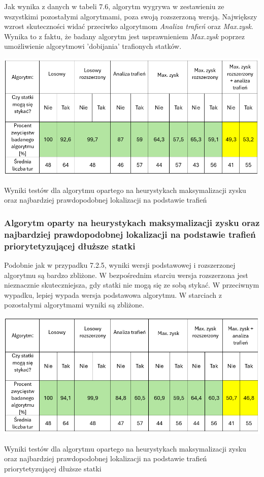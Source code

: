 Jak wynika z danych w tabeli 7.6, algorytm wygrywa w zestawieniu ze wszystkimi pozostałymi algorytmami, poza swoją rozszerzoną wersją. Największy wzrost skuteczności widać przeciwko algorytmom \emph{Analiza trafień} oraz \emph{Max.zysk}. Wynika to z faktu, że badany algorytm jest usprawnieniem \emph{Max.zysk} poprzez umożliwienie algorytmowi 'dobijania' trafionych statków.

\begin{table}[!h]
    \centering
    \includegraphics[width=1\linewidth]{img/table-location-hit-heuristic.png}
    \caption{Wyniki testów dla algorytmu opartego na heurystykach maksymalizacji zysku oraz najbardziej prawdopodobnej lokalizacji na podstawie trafień}
\end{table}

\subsubsection{Algorytm oparty na heurystykach maksymalizacji zysku oraz najbardziej prawdopodobnej lokalizacji na podstawie trafień priorytetyzującej dłuższe statki}

Podobnie jak w przypadku 7.2.5, wyniki wersji podstawowej i rozszerzonej algorytmu są bardzo zbliżone. W bezpośrednim starciu wersja rozszerzona jest nieznacznie skuteczniejsza, gdy statki nie mogą się ze sobą stykać. W przeciwnym wypadku, lepiej wypada wersja podstawowa algorytmu. W starciach z pozostałymi algorytmami wyniki są zbliżone.

\begin{table}[!h]
    \centering
    \includegraphics[width=1\linewidth]{img/table-location-extended-hit-heuristic.png}
    \caption{Wyniki testów dla algorytmu opartego na heurystykach maksymalizacji zysku oraz najbardziej prawdopodobnej lokalizacji na podstawie trafień priorytetyzującej dłuższe statki}
\end{table}

